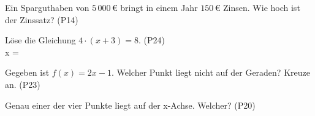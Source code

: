 \documentclass[11pt]{article}
\begin{document}
\begin{aufgabe}{Ein Sparguthaben von $5\,000\,€$ bringt in einem Jahr $150\,€$ Zinsen. Wie hoch ist der Zinssatz? \hfill (P14) \\ \leerfeld[\%]}
\end{aufgabe}

\begin{aufgabe}{Löse die Gleichung $4 \cdot (x + 3) = 8$. \hfill (P24) \\ x = \leerfeld}
\end{aufgabe}

\begin{aufgabe}{Gegeben ist $f(x) = 2x - 1$. Welcher Punkt liegt nicht auf der Geraden? Kreuze an. \hfill (P23) \\   }
\end{aufgabe}

\begin{aufgabe}{Genau einer der vier Punkte liegt auf der x-Achse. Welcher? \hfill (P20) \\    }
\end{aufgabe}

\begleitteil
{}
\end{document}
